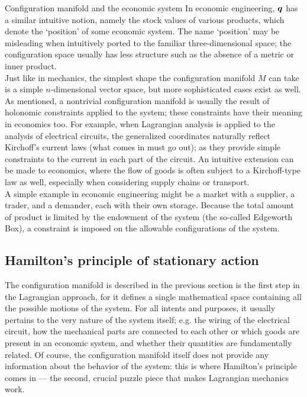\begin{econ}{Configuration manifold and the economic system}
    In economic engineering, \(\vb*{q}\) has a similar intuitive notion, namely the stock values of various products, which denote the `position' of some economic system. The name `position' may be misleading when intuitively ported to the familiar three-dimensional space; the configuration space usually has less structure such as the absence of a metric or inner product.\\

    Just like in mechanics, the simplest shape the configuration manifold $M$ can take is a simple $n$-dimensional vector space, but more sophisticated cases exist as well. As mentioned, a nontrivial configuration manifold is usually the result of holonomic constraints applied to the system; these constraints have their meaning in economics too.
    For example, when Lagrangian analysis is applied to the analysis of electrical circuits, the generalized coordinates naturally reflect Kirchoff's current laws (what comes in must go out); as they provide simple constraints to the current in each part of the circuit. An intuitive extension can be made to economics, where the flow of goods is often subject to a Kirchoff-type law as well, especially when considering supply chains or transport. \\
    
    A simple example in economic engineering might be a market with a supplier, a trader, and a demander, each with their own storage. Because the total amount of product is limited by the endowment of the system (the so-called Edgeworth Box), a constraint is imposed on the allowable configurations of the system.
\end{econ}

\subsection{Hamilton's principle of stationary action}
The configuration manifold is described in the previous section is the first step in the Lagrangian approach, for it defines a single mathematical space containing all the possible motions of the system. For all intents and purposes, it usually pertains to the very nature of the system itself; e.g. the wiring of the electrical circuit, how the mechanical parts are connected to each other or which goods are present in an economic system, and whether their quantities are fundamentally related. Of course, the configuration manifold itself does not provide any information about the behavior of the system: this is where Hamilton's principle comes in --- the second, crucial puzzle piece that makes Lagrangian mechanics work.

